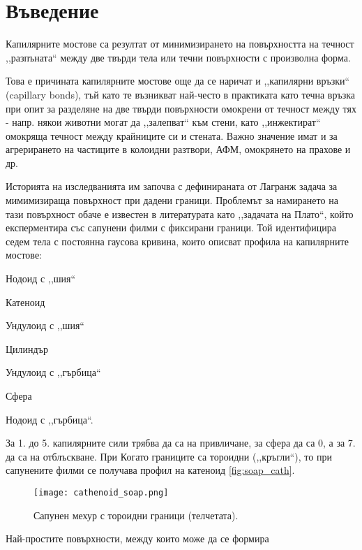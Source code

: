 \section{Въведение}
Капилярните мостове са резултат от минимизирането на повърхността на течност
,,разпъната`` между две твърди тела или течни повърхности с произволна форма.

Това е причината капилярните мостове още да се наричат и ,,капилярни връзки`` (capillary bonds),
тъй като те възникват най-често в практиката като течна връзка при опит за разделяне на две
твърди повърхности омокрени от течност между тях - напр. някои животни могат да ,,залепват`` към
стени, като ,,инжектират`` омокряща течност между \cite{Persson_2007} крайниците си и стената.
Важно значение имат и за агрерирането на частиците в колоидни разтвори, АФМ, омокрянето на прахове и др.

Историята на изследванията им започва с дефинираната от Лагранж задача за мимимизираща повърхност
при дадени граници. Проблемът за намирането на тази повърхност обаче е известен в литературата
като ,,задачата на Плато``, който експерментира със сапунени филми с фиксирани граници.
Той идентифицира седем тела с постоянна гаусова кривина, които описват профила на капилярните мостове:
\begin{enumerate*}
    \item Нодоид с ,,шия``
    \item Катеноид
    \item Ундулоид с ,,шия``
    \item Цилиндър
    \item Ундулоид с ,,гърбица``
    \item Сфера
    \item Нодоид с ,,гърбица``.
\end{enumerate*}
За 1. до 5. капилярните сили трябва да са на привличане, за сфера да са 0, а за 7. да са на
отблъскване. При \cite{Kralchevsky}
Когато границите са тороидни (,,кръгли``), то при сапунените филми се получава профил на катеноид \autoref{fig:soap_cath}.
\begin{figure}[h]
    \centering
    \texttt{[image: cathenoid\_soap.png]}
    \caption{Сапунен мехур с тороидни граници (телчетата).\cite{Soap_cathenoid}}
    \label{fig:soap_cath}
\end{figure}

Най-простите повърхности, между които може да се формира 